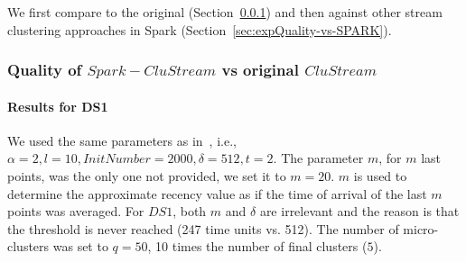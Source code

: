 We first compare \our to the original \clustream (Section~\ref{sec:expQuality-vs-CluStream}) and then against other stream clustering approaches in Spark (Section~\ref{sec:expQuality-vs-SPARK}).

\subsubsection{Quality of $Spark-CluStream$ vs original $CluStream$}
\label{sec:expQuality-vs-CluStream}
\paragraph{Results for DS1}


We used the same parameters as in~\cite{clustreamOrig}, i.e., $\alpha=2,l=10,InitNumber=2000,\delta=512,t=2$.
The parameter $m$, for $m$ last points, was the only one not provided, we set it to $m=20$. $m$ is used to determine the approximate recency value as if the time of arrival of the last $m$ points was averaged.
For $DS1$, both $m$ and $\delta$ are irrelevant and the reason is that the threshold is never reached (247 time units vs. 512). 
The number of micro-clusters was set to $q=50$, 10 times the number of final clusters ($5$). 

